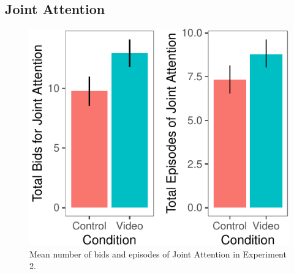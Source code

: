 \documentclass[10pt, letterpaper]{article}
\newenvironment{CodeChunk}{}{}
\begin{document}
\subsection{Joint Attention}\label{joint-attention-1}

\begin{CodeChunk}
\begin{figure}[H]

{\centering \includegraphics{figs/e2ja-graphs-1} 

}

\caption[Mean number of bids and episodes of Joint Attention in Experiment 2]{Mean number of bids and episodes of Joint Attention in Experiment 2.}\label{fig:e2ja-graphs}
\end{figure}
\end{CodeChunk}
\end{document}
